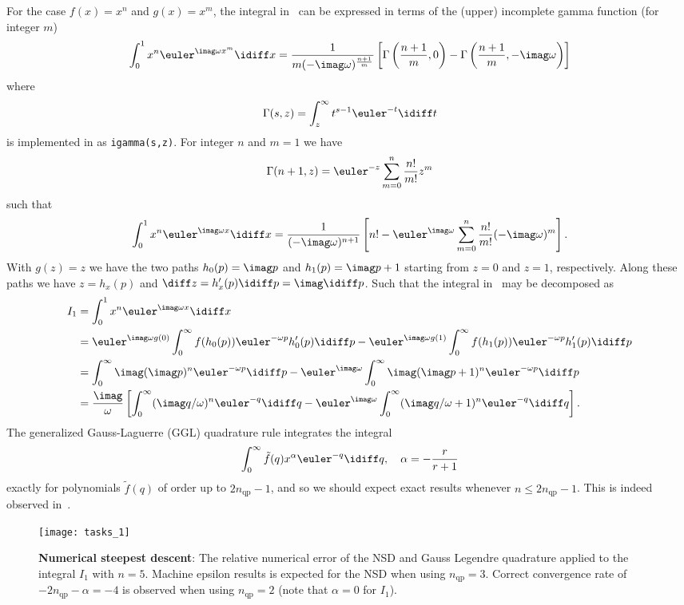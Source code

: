 For the case $f(x) = x^n$ and $g(x)=x^m$, the integral in~ can be expressed in terms of the (upper) incomplete gamma function (for integer $m$)
\begin{equation*}
	\int_0^1 x^n \euler^{\imag \omega x^m}\idiff x = \frac{1}{m(-\imag\omega)^{\frac{n+1}{m}}}\left[\Gamma\left(\frac{n+1}{m},0\right)-\Gamma\left(\frac{n+1}{m},-\imag\omega\right)\right]
\end{equation*}
where
\begin{equation*}
	\Gamma(s,z) = \int_z^\infty t^{s-1}\euler^{-t}\idiff t
\end{equation*}
is implemented in \MATLAB as \verb|igamma(s,z)|. For integer $n$ and $m=1$ we have
\begin{equation*}
	\Gamma(n+1,z) = \euler^{-z}\sum_{m=0}^n\frac{n!}{m!}z^m
\end{equation*}
such that
\begin{equation*}
	\int_0^1 x^n \euler^{\imag \omega x}\idiff x = \frac{1}{(-\imag \omega)^{n+1}}\left[n! -  \euler^{\imag \omega}\sum_{m=0}^n \frac{n!}{m!}(-\imag \omega)^m\right].
\end{equation*}
With $g(z) = z$ we have the two paths $h_0(p) = \imag p$ and $h_1(p) = \imag p+1$ starting from $z=0$ and $z=1$, respectively. Along these paths we have $z=h_x(p)$ and $\diff z=h_x'(p)\idiff p=\imag\idiff p$. Such that the integral in~ may be decomposed as
\begin{align*}
	I_1 &= \int_0^1 x^n \euler^{\imag \omega x}\idiff x \\
	  &= \euler^{\imag\omega g(0)}\int_0^\infty f(h_0(p))\euler^{-\omega p}h_0'(p)\idiff p - \euler^{\imag\omega g(1)}\int_0^\infty f(h_1(p))\euler^{-\omega p}h_1'(p)\idiff p\\
	  &= \int_0^\infty \imag(\imag p)^n\euler^{-\omega p}\idiff p - \euler^{\imag\omega}\int_0^\infty \imag(\imag p+1)^n\euler^{-\omega p}\idiff p\\
	  &= \frac{\imag}{\omega}\left[\int_0^\infty (\imag q/\omega)^n\euler^{-q}\idiff q - \euler^{\imag\omega}\int_0^\infty (\imag q/\omega+1)^n\euler^{-q}\idiff q\right].
\end{align*}
The generalized Gauss-Laguerre (GGL) quadrature rule integrates the integral
\begin{equation*}
	\int_0^\infty \tilde{f}(q)x^\alpha\euler^{-q}\idiff q,\quad \alpha = -\frac{r}{r+1}
\end{equation*}
exactly for polynomials $\tilde{f}(q)$ of order up to $2n_{\mathrm{qp}}-1$, and so we should expect exact results whenever $n\leq 2n_{\mathrm{qp}}-1$. This is indeed observed in~.
\begin{figure}
	\centering
	\texttt{[image: tasks\_1]}
	\caption{\textbf{Numerical steepest descent}: The relative numerical error of the NSD and Gauss Legendre quadrature applied to the integral $I_1$ with $n=5$. Machine epsilon results is expected for the NSD when using $n_{\mathrm{qp}}=3$. Correct convergence rate of $-2n_{\mathrm{qp}}-\alpha=-4$ is observed when using $n_{\mathrm{qp}}=2$ (note that $\alpha=0$ for $I_1$).}
	\label{Fig4:tasks_1}
\end{figure}

